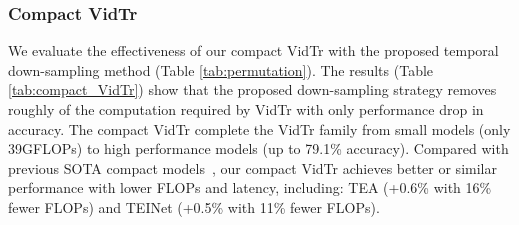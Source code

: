 \documentclass[10pt,twocolumn,letterpaper]{article}
\begin{document}
\subsubsection{Compact VidTr}
We evaluate the effectiveness of our compact VidTr with the proposed temporal down-sampling method (Table \ref{tab:permutation}). 
The results (Table \ref{tab:compact_VidTr}) show that the proposed down-sampling strategy removes roughly  of the computation required by VidTr with only  performance drop in accuracy. The compact VidTr complete the VidTr family from small models (only 39GFLOPs) to high performance models (up to 79.1\% accuracy).
Compared with previous SOTA compact models~\cite{li2020tea,liu_AAAI2020_TEINet}, our compact VidTr achieves better or similar performance with lower FLOPs and latency, including: TEA (+0.6\% with 16\% fewer FLOPs) and TEINet (+0.5\% with 11\% fewer FLOPs).
\begin{table}[t]
    \footnotesize
	\begin{center}
	\end{center}
	\caption[Caption for LOF]{Comparison of VidTr to other fast networks. We present the number of views used for evaluation and FLOPs required for each view. The latency denotes the total time required to get the reported top-1 score.\protect\footnotemark }
	\label{tab:compact_VidTr}
\end{table}
\end{document}
